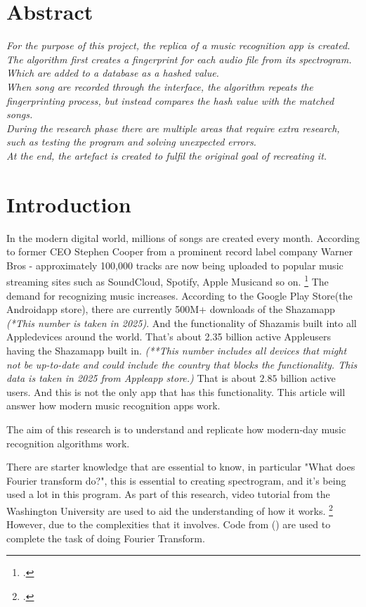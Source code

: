 \chapter*{Abstract}
\textit{For the purpose of this project, the replica of a music recognition app is created.}\\
\textit{The algorithm first creates a fingerprint for each audio file from its spectrogram. Which are added to a database as a hashed value.}\\
\textit{When song are recorded through the interface, the algorithm repeats the fingerprinting process, but instead compares the hash value with the matched songs.}\\
\textit{During the research phase there are multiple areas that require extra research, such as testing the program and solving unexpected errors.}\\
\textit{At the end, the artefact is created to fulfil the original goal of recreating it.}
\chapter{Introduction}

In the modern digital world, millions of songs are created every month. According to former CEO Stephen Cooper from a prominent record label company Warner Bros - approximately 100,000 tracks are now being uploaded to popular music streaming sites such as SoundCloud\trademark, Spotify\trademark, Apple Music\trademark  and so on. \footcite{ingham_100000_2022} The demand for recognizing music increases. According to the Google Play Store\trademark (the Android\trademark app store), there are currently 500M+ downloads of the Shazam\trademark app \textit{(*This number is taken in 2025)}. And the functionality of Shazam\trademark is built into all Apple\trademark devices around the world. That's about 2.35 billion active Apple\trademark users having the Shazam\trademark app built in. \textit{(**This number includes all devices that might not be up-to-date and could include the country that blocks the functionality. This data is taken in 2025 from Apple\trademark app store.)} That is about $2.85$ billion active users. And this is not the only app that has this functionality. This article will answer how modern music recognition apps work.

The aim of this research is to understand and replicate how modern-day music recognition algorithms work. 

There are starter knowledge that are essential to know, in particular "What does Fourier transform do?", this is essential to creating spectrogram, and it's being used a lot in this program. As part of this research, video tutorial from the Washington University are used to aid the understanding of how it works. \footcite{brunton_fast_2020} However, due to the complexities that it involves. Code from (\cite{virtanen_scipy_2020}) are used to complete the task of doing Fourier Transform.

